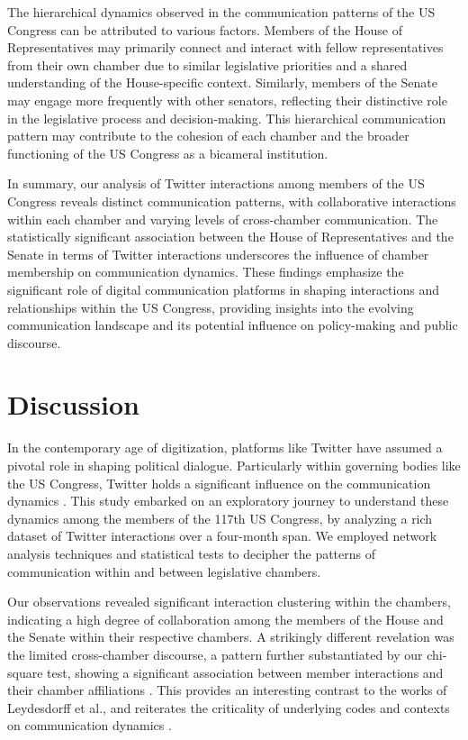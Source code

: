 \documentclass[11pt]{article}
\begin{document}
The hierarchical dynamics observed in the communication patterns of the US Congress can be attributed to various factors. Members of the House of Representatives may primarily connect and interact with fellow representatives from their own chamber due to similar legislative priorities and a shared understanding of the House-specific context. Similarly, members of the Senate may engage more frequently with other senators, reflecting their distinctive role in the legislative process and decision-making. This hierarchical communication pattern may contribute to the cohesion of each chamber and the broader functioning of the US Congress as a bicameral institution.

In summary, our analysis of Twitter interactions among members of the US Congress reveals distinct communication patterns, with collaborative interactions within each chamber and varying levels of cross-chamber communication. The statistically significant association between the House of Representatives and the Senate in terms of Twitter interactions underscores the influence of chamber membership on communication dynamics. These findings emphasize the significant role of digital communication platforms in shaping interactions and relationships within the US Congress, providing insights into the evolving communication landscape and its potential influence on policy-making and public discourse.

\section*{Discussion}

In the contemporary age of digitization, platforms like Twitter have assumed a pivotal role in shaping political dialogue. Particularly within governing bodies like the US Congress, Twitter holds a significant influence on the communication dynamics \cite{Theocharis2020TheDO, Tsur2015AFO}. This study embarked on an exploratory journey to understand these dynamics among the members of the 117th US Congress, by analyzing a rich dataset of Twitter interactions over a four-month span. We employed network analysis techniques and statistical tests to decipher the patterns of communication within and between legislative chambers.

Our observations revealed significant interaction clustering within the chambers, indicating a high degree of collaboration among the members of the House and the Senate within their respective chambers. A strikingly different revelation was the limited cross-chamber discourse, a pattern further substantiated by our chi-square test, showing a significant association between member interactions and their chamber affiliations \cite{Yarchi2020PoliticalPO}. This provides an interesting contrast to the works of Leydesdorff et al., and reiterates the criticality of underlying codes and contexts on communication dynamics \cite{Leydesdorff2017UvADAREA}.
\end{document}
